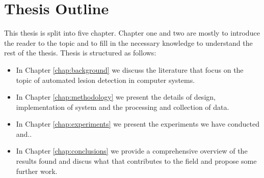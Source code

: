 \documentclass[thesis.tex]{subfiles}
\begin{document}
\section{Thesis Outline} \label{sec:thesis_outline}
This thesis is split into five chapter. Chapter one and two are mostly to introduce the reader to the topic and to fill in the necessary knowledge to understand the rest of the thesis. Thesis is structured as follows:

\begin{itemize}
\item In Chapter \ref{chap:background} we discuss the literature that focus on the topic of automated lesion detection in computer systems.

\item In Chapter \ref{chap:methodology} we present the details of design, implementation of system and the processing and collection of data.

\item In Chapter \ref{chap:experiments} we present the experiments we have conducted and..

\item In Chapter \ref{chap:conclusions} we provide a comprehensive overview of the results found and discus what that contributes to the field and propose some further work.

\end{itemize}
\end{document}
